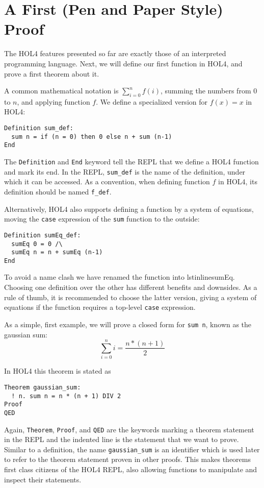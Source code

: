 \section{A First (Pen and Paper Style) Proof}\label{sec:hol_ex1}
%
The HOL4 features presented so far are exactly those of an interpreted
programming language.
Next, we will define our first function in HOL4, and prove a first theorem about
it.

A common mathematical notation is $\sum_{i=0}^n f (i)$,
summing the numbers from $0$ to $n$, and applying function $f$.
We define a specialized version for $f (x) = x$ in HOL4:

\begin{lstlisting}
Definition sum_def:
  sum n = if (n = 0) then 0 else n + sum (n-1)
End
\end{lstlisting}

The \lstinline{Definition} and \lstinline{End} keyword tell the REPL that we
define a HOL4 function and mark its end.
In the REPL, \lstinline{sum_def} is the name of the definition, under which it
can be accessed.
As a convention, when defining function $f$ in HOL4, its definition should be
named \lstinline{f_def}.

Alternatively, HOL4 also supports defining a function by a system of equations,
moving the \texttt{case} expression of the \lstinline{sum} function to the
outside:
%
\begin{lstlisting}[float,floatplacement=H]
Definition sumEq_def:
  sumEq 0 = 0 /\
  sumEq n = n + sumEq (n-1)
End
\end{lstlisting}

To avoid a name clash we have renamed the function into lstinline{sumEq}.
Choosing one definition over the other has different benefits and downsides.
As a rule of thumb, it is recommended to choose the latter version, giving a
system of equations if the function requires a top-level \texttt{case}
expression.

As a simple, first example, we will prove a closed form for \lstinline{sum n},
known as the gaussian sum:
\[
  \sum_{i=0}^{n} i = \frac{n * (n + 1)}{2}
\]

In HOL4 this theorem is stated as

\begin{lstlisting}
Theorem gaussian_sum:
  ! n. sum n = n * (n + 1) DIV 2
Proof
QED
\end{lstlisting}

Again, \lstinline{Theorem}, \lstinline{Proof}, and \lstinline{QED} are the
keywords marking a theorem statement in the REPL and the indented line is
the statement that we want to prove.
Similar to a definition, the name \lstinline{gaussian_sum} is an identifier
which is used later to refer to the theorem statement proven in other proofs.
This makes theorems first class citizens of the HOL4 REPL, also allowing
functions to manipulate and inspect their statements.

